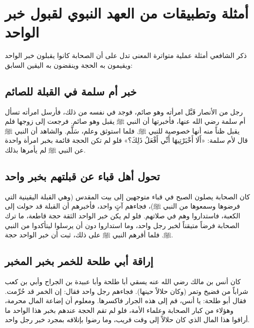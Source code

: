 \section{أمثلة وتطبيقات من العهد النبوي لقبول خبر الواحد}
ذكر الشافعي أمثلة عملية متواترة المعنى تدل على أن الصحابة كانوا يقبلون خبر الواحد ويقيمون به الحجة وينقضون به اليقين السابق:

\subsection{خبر أم سلمة في القبلة للصائم}
رجل من الأنصار قَبَّل امرأته وهو صائم، فوجد في نفسه من ذلك، فأرسل امرأته تسأل أم سلمة رضي الله عنها، فأخبرتها أن النبي ﷺ يقبل وهو صائم. فرجعت إلى زوجها فلم يقبل ظناً منه أنها خصوصية للنبي ﷺ. فلما استوثق وعلم، سَلَّم. والشاهد أن النبي ﷺ قال لأم سلمة: «أَلَا أَخْبَرْتِيهَا أَنِّي أَفْعَلُ ذَلِكَ؟» فلو لم تكن الحجة قائمة بخبر امرأة واحدة عن النبي ﷺ لم يأمرها بذلك.

\subsection{تحول أهل قباء عن قبلتهم بخبر واحد}
كان الصحابة يصلون الصبح في قباء متوجهين إلى بيت المقدس (وهي القبلة اليقينية التي فرضوها وسمعوها من النبي ﷺ)، فجاءهم آتٍ واحد، فأخبرهم أن القبلة قد حولت إلى الكعبة، فاستداروا وهم في صلاتهم. فلو لم يكن خبر الواحد الثقة حجة قاطعة، ما ترك الصحابة فرضاً متيقناً لخبر رجل واحد، وما استداروا دون أن يرسلوا ليتأكدوا من النبي ﷺ. فلما أقرهم النبي ﷺ على ذلك، ثبت أن خبر الواحد حجة.

\subsection{إراقة أبي طلحة للخمر بخبر المخبر}
كان أنس بن مالك رضي الله عنه يسقي أبا طلحة وأبا عبيدة بن الجراح وأبي بن كعب شراباً من فضيخ وتمر (وكان حلالاً حينها). فجاءهم رجل واحد فقال: إن الخمر قد حُرِّمت. فقال أبو طلحة: يا أنس، قم إلى هذه الجرار فاكسرها. 
ومعلوم أن إضاعة المال محرمة، وهؤلاء من كبار الصحابة وعلماء الأمة، فلو لم تقم الحجة عندهم بخبر هذا الواحد ما أراقوا هذا المال الذي كان حلالاً إلى وقت قريب، وما رضوا بإتلافه بمجرد خبر رجل واحد.

